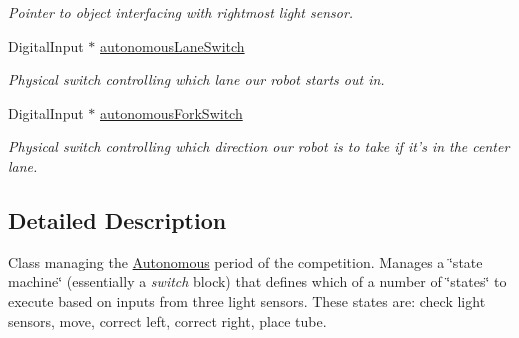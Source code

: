 \begin{DoxyCompactItemize}
\begin{DoxyCompactList}\small\item\em Pointer to object interfacing with rightmost light sensor. \item\end{DoxyCompactList}\item 
\hypertarget{class_r_j_f_r_c2011_1_1_autonomous_ac54600742a1c7e9d6de932cc16653534}{
DigitalInput $\ast$ \hyperlink{class_r_j_f_r_c2011_1_1_autonomous_ac54600742a1c7e9d6de932cc16653534}{autonomousLaneSwitch}}
\label{class_r_j_f_r_c2011_1_1_autonomous_ac54600742a1c7e9d6de932cc16653534}

\begin{DoxyCompactList}\small\item\em Physical switch controlling which lane our robot starts out in. \item\end{DoxyCompactList}\item 
\hypertarget{class_r_j_f_r_c2011_1_1_autonomous_a5b1c68931c034a23970d6933ed7e3dcc}{
DigitalInput $\ast$ \hyperlink{class_r_j_f_r_c2011_1_1_autonomous_a5b1c68931c034a23970d6933ed7e3dcc}{autonomousForkSwitch}}
\label{class_r_j_f_r_c2011_1_1_autonomous_a5b1c68931c034a23970d6933ed7e3dcc}

\begin{DoxyCompactList}\small\item\em Physical switch controlling which direction our robot is to take if it's in the center lane. \item\end{DoxyCompactList}\end{DoxyCompactItemize}


\subsection{Detailed Description}
Class managing the \hyperlink{class_r_j_f_r_c2011_1_1_autonomous}{Autonomous} period of the competition. Manages a \char`\"{}state machine\char`\"{} (essentially a {\itshape switch\/} block) that defines which of a number of \char`\"{}states\char`\"{} to execute based on inputs from three light sensors. These states are: check light sensors, move, correct left, correct right, place tube. 

